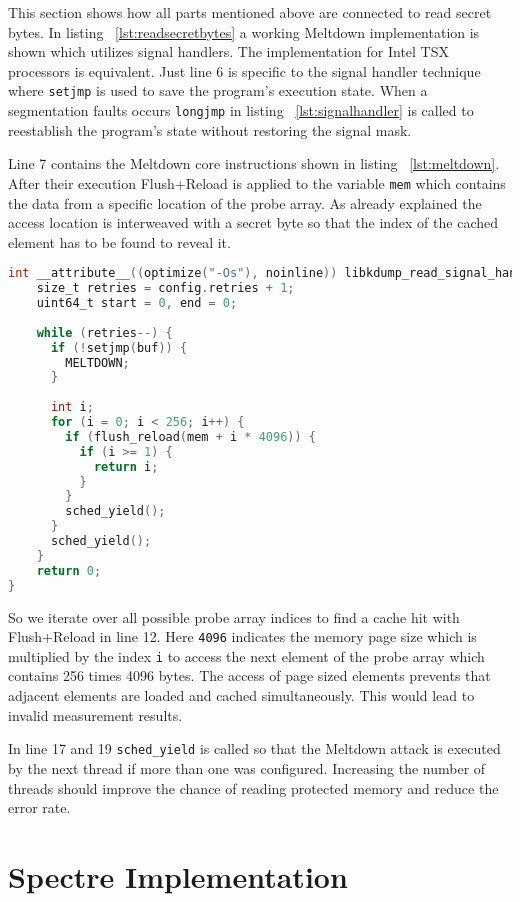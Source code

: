 \documentclass[a4paper,oneside,openright] {scrreprt}
\begin{document}
This section shows how all parts mentioned above are connected to read secret bytes.
In listing ~\ref{lst:readsecretbytes} a working Meltdown implementation is shown which utilizes
signal handlers. The implementation for Intel TSX processors is equivalent.
Just line 6 is specific to the signal handler technique where \texttt{setjmp} is used to save the program's execution state.
When a segmentation faults occurs \texttt{longjmp} in listing ~\ref{lst:signalhandler} is called to reestablish the program's state
without restoring the signal mask.

Line 7 contains the Meltdown core instructions shown in listing ~\ref{lst:meltdown}.
After their execution Flush+Reload is applied to the variable \texttt{mem} which contains the data
from a specific location of the probe array. As already explained the access location is interweaved with a
secret byte so that the index of the cached element has to be found to reveal it.


\begin{lstlisting}[language=C, caption=Meltdown: Reading Secret Bytes, label={lst:readsecretbytes}]
int __attribute__((optimize("-Os"), noinline)) libkdump_read_signal_handler() {
    size_t retries = config.retries + 1;
    uint64_t start = 0, end = 0;
  
    while (retries--) {
      if (!setjmp(buf)) {
        MELTDOWN;
      }
  
      int i;
      for (i = 0; i < 256; i++) {
        if (flush_reload(mem + i * 4096)) {
          if (i >= 1) {
            return i;
          }
        }
        sched_yield();
      }
      sched_yield();
    }
    return 0;
}
\end{lstlisting}

So we iterate over all possible probe array indices to find a cache hit with Flush+Reload in line 12.
Here \texttt{4096} indicates the memory page size which is multiplied by the index \texttt{i} to access the next element
of the probe array which contains 256 times 4096 bytes. The access of page sized elements prevents that adjacent elements are loaded
and cached simultaneously. This would lead to invalid measurement results.

In line 17 and 19 \texttt{sched\_yield} is called so that the Meltdown attack is executed by the next thread if more
than one was configured. 
Increasing the number of threads should improve the chance of reading protected memory and reduce the error rate.


\section{Spectre Implementation}
\label{ch:intro:motivation}
\end{document}
